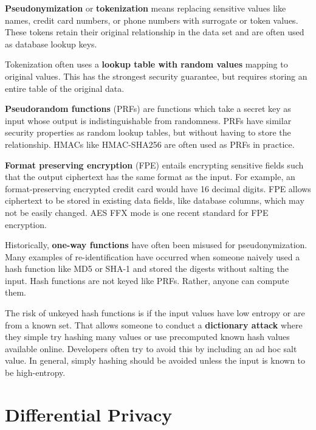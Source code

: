 \documentclass[nobib]{tufte-handout}
\begin{document}
\textbf{Pseudonymization} or \textbf{tokenization} means replacing sensitive
values like names, credit card numbers, or phone numbers with surrogate or token
values. These tokens retain their original relationship in the data set and are
often used as database lookup keys.

Tokenization often uses a \textbf{lookup table with random values} mapping to
original values. This has the strongest security guarantee, but requires storing
an entire table of the original data.

\textbf{Pseudorandom functions} (PRFs) are functions which take a secret key as
input whose output is indistinguishable from randomness. PRFs have similar
security properties as random lookup tables, but without having to store the
relationship. HMACs like HMAC-SHA256 are often used as PRFs in practice.

\textbf{Format preserving encryption} \cite{DBLP:conf/sacrypt/BellareRRS09}
(FPE) entails encrypting sensitive fields such that the output ciphertext has
the same format as the input. For example, an format-preserving encrypted credit
card would have 16 decimal digits. FPE allows ciphertext to be stored in existing data fields,
like database columns, which may not be easily changed.
AES FFX mode \cite{dworkin2016recommendation}
is one recent standard for FPE encryption.


Historically, \textbf{one-way functions} have often been misused for
pseudonymization. Many examples of re-identification have occurred when someone
naively used a hash function like MD5 or SHA-1 and stored the digests without
salting the input. Hash functions are not keyed like PRFs. Rather, anyone can
compute them.

The risk of unkeyed hash functions is if the input values have low entropy or
are from a known set. That allows someone to conduct a \textbf{dictionary
attack} where they simple try hashing many values or use precomputed known hash
values available online. Developers often try to avoid this by including an ad
hoc salt value. In general, simply hashing should be avoided unless the input is
known to be high-entropy.

\section{Differential Privacy}
\end{document}
